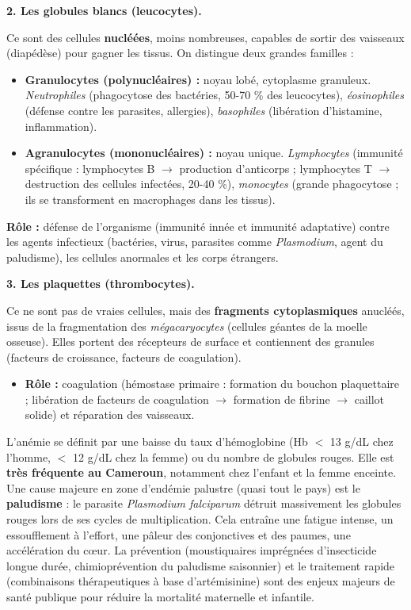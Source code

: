 \documentclass[11pt]{article}
\newcommand{\cle}[1]{{\popxbold\color{popdark}#1}}
\begin{document}
\textbf{2. Les globules blancs (leucocytes).}\par
Ce sont des cellules \textbf{nucléées}, moins nombreuses, capables de sortir des vaisseaux (\cle{diapédèse}) pour gagner les tissus. On distingue deux grandes familles :
\begin{itemize}
    \item \textbf{Granulocytes (polynucléaires) :} noyau lobé, cytoplasme granuleux. \emph{Neutrophiles} (phagocytose des bactéries, 50-70 \% des leucocytes), \emph{éosinophiles} (défense contre les parasites, allergies), \emph{basophiles} (libération d'histamine, inflammation).
    \item \textbf{Agranulocytes (mononucléaires) :} noyau unique. \emph{Lymphocytes} (immunité spécifique : lymphocytes B $\to$ production d'anticorps ; lymphocytes T $\to$ destruction des cellules infectées, 20-40 \%), \emph{monocytes} (grande phagocytose ; ils se transforment en macrophages dans les tissus).
\end{itemize}
\textbf{Rôle :} \cle{défense de l'organisme} (immunité innée et immunité adaptative) contre les agents infectieux (bactéries, virus, parasites comme \emph{Plasmodium}, agent du paludisme), les cellules anormales et les corps étrangers.

\textbf{3. Les plaquettes (thrombocytes).}\par
Ce ne sont pas de vraies cellules, mais des \textbf{fragments cytoplasmiques} anucléés, issus de la fragmentation des \emph{mégacaryocytes} (cellules géantes de la moelle osseuse). Elles portent des récepteurs de surface et contiennent des granules (facteurs de croissance, facteurs de coagulation).
\begin{itemize}
    \item \textbf{Rôle :} \cle{coagulation} (hémostase primaire : formation du bouchon plaquettaire ; libération de facteurs de coagulation $\to$ formation de fibrine $\to$ caillot solide) et réparation des vaisseaux.
\end{itemize}

\begin{savaistu}
L'\cle{anémie} se définit par une baisse du taux d'hémoglobine (Hb $<$ 13 g/dL chez l'homme, $<$ 12 g/dL chez la femme) ou du nombre de globules rouges. Elle est \textbf{très fréquente au Cameroun}, notamment chez l'enfant et la femme enceinte.
Une cause majeure en zone d'endémie palustre (quasi tout le pays) est le \textbf{paludisme} : le parasite \emph{Plasmodium falciparum} détruit massivement les globules rouges lors de ses cycles de multiplication. Cela entraîne une fatigue intense, un essoufflement à l'effort, une pâleur des conjonctives et des paumes, une accélération du cœur. La prévention (moustiquaires imprégnées d'insecticide longue durée, chimioprévention du paludisme saisonnier) et le traitement rapide (combinaisons thérapeutiques à base d'artémisinine) sont des enjeux majeurs de santé publique pour réduire la mortalité maternelle et infantile.
\end{savaistu}
\end{document}
